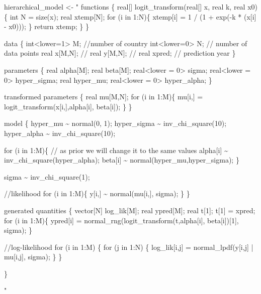 \documentclass[
]{article}
\newenvironment{Shaded}{\begin{snugshade}}{\end{snugshade}}
\newcommand{\NormalTok}[1]{#1}
\newcommand{\OtherTok}[1]{\textcolor[rgb]{0.56,0.35,0.01}{#1}}
\newcommand{\StringTok}[1]{\textcolor[rgb]{0.31,0.60,0.02}{#1}}
\begin{document}
\begin{Shaded}
\begin{Highlighting}[]
\NormalTok{hierarchical\_model }\OtherTok{\textless{}{-}} \StringTok{"}
\StringTok{functions \{}
\StringTok{  real[] logit\_transform(real[] x, real k, real x0) \{}
\StringTok{    int N = size(x);}
\StringTok{    real xtemp[N];}
\StringTok{    for (i in 1:N)\{}
\StringTok{      xtemp[i] = 1 / (1 + exp({-}k * (x[i] {-} x0)));}
\StringTok{    \}}
\StringTok{     return xtemp;}
\StringTok{  \}}
\StringTok{\}}

\StringTok{data \{}
\StringTok{    int\textless{}lower=1\textgreater{} M; //number of country}
\StringTok{    int\textless{}lower=0\textgreater{} N; // number of data points}
\StringTok{    real x[M,N]; //}
\StringTok{    real y[M,N]; //}
\StringTok{    real xpred;  // prediction year}
\StringTok{\}}

\StringTok{parameters \{}
\StringTok{  real alpha[M];}
\StringTok{  real beta[M];}
\StringTok{  real\textless{}lower = 0\textgreater{} sigma;}
\StringTok{  real\textless{}lower = 0\textgreater{} hyper\_sigma;}
\StringTok{  real hyper\_mu;}
\StringTok{  real\textless{}lower = 0\textgreater{} hyper\_alpha;}
\StringTok{\}}

\StringTok{transformed parameters \{}
\StringTok{  real mu[M,N];}
\StringTok{  for (i in 1:M)\{}
\StringTok{    mu[i,] = logit\_transform(x[i,],alpha[i], beta[i]);}
\StringTok{  \}}
\StringTok{\}}

\StringTok{model \{}
\StringTok{    hyper\_mu \textasciitilde{} normal(0, 1);}
\StringTok{    hyper\_sigma \textasciitilde{} inv\_chi\_square(10);}
\StringTok{    hyper\_alpha \textasciitilde{} inv\_chi\_square(10);}

\StringTok{  for (i in 1:M)\{}
\StringTok{    // as prior we will change it to the same values}
\StringTok{    alpha[i] \textasciitilde{} inv\_chi\_square(hyper\_alpha);}
\StringTok{    beta[i] \textasciitilde{} normal(hyper\_mu,hyper\_sigma);}
\StringTok{  \}}

\StringTok{  sigma \textasciitilde{} inv\_chi\_square(1);}

\StringTok{  //likelihood}
\StringTok{  for (i in 1:M)\{}
\StringTok{    y[i,] \textasciitilde{} normal(mu[i,], sigma);}
\StringTok{  \}}
\StringTok{\}}

\StringTok{generated quantities \{}
\StringTok{  vector[N] log\_lik[M];}
\StringTok{  real ypred[M];}
\StringTok{  real t[1];}
\StringTok{  t[1] = xpred;}
\StringTok{  for (i in 1:M)\{}
\StringTok{    ypred[i] = normal\_rng(logit\_transform(t,alpha[i], beta[i])[1], sigma);}
\StringTok{  \}}

\StringTok{  //log{-}likelihood}
\StringTok{  for (i in 1:M) \{}
\StringTok{    for (j in 1:N) \{}
\StringTok{    log\_lik[i,j] = normal\_lpdf(y[i,j] | mu[i,j], sigma);}
\StringTok{    \}}
\StringTok{  \}}

\StringTok{\}}

\StringTok{"}
\end{Highlighting}
\end{Shaded}
\end{document}
